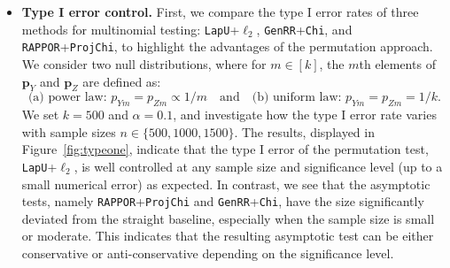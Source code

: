 \documentclass[twoside,11pt]{article}
\newcommand{\rvTwo}{Y}
\newcommand{\rvThree}{Z}
\newcommand{\vectorize}[1]{\mathbf{#1}}
\newcommand{\alphabetSize}{k} %
\newcommand{\vectorIndex}{m}
\newcommand{\probVecElement}[2]{p_{{#1}{#2}}}
\newcommand{\privacyParameter}{\alpha} %
\begin{document}
\begin{itemize}
\item \textbf{Type I error control.}
First, we compare the type I error rates of three methods for multinomial testing: \texttt{LapU}+\texttt{$\ell_2$}, \texttt{GenRR}+\texttt{Chi}, and \texttt{RAPPOR}+\texttt{ProjChi}, to highlight the advantages of the permutation approach. We consider two null distributions, where for \( m \in [\alphabetSize] \), the \( m \)th elements of \( \vectorize{p}_Y \) and \( \vectorize{p}_Z \) are defined as:
\begin{equation}\label{nulldist}
	\text{(a) power law: }\probVecElement{\rvTwo}{\vectorIndex} = \probVecElement{\rvThree}{\vectorIndex} \propto 1/\vectorIndex \quad \text{and} \quad \text{(b) uniform law: }\probVecElement{\rvTwo}{\vectorIndex} = \probVecElement{\rvThree}{\vectorIndex}=1/\alphabetSize.
\end{equation}
We set \(\alphabetSize = 500\) and \(\privacyParameter = 0.1\), and investigate how the type I error rate varies with sample sizes $n \in \{500, 1000, 1500\}$. The results, displayed in Figure~\ref{fig:typeone}, indicate that the type I error of the permutation test, \texttt{LapU}+\texttt{$\ell_2$}, is well controlled at any sample size and significance level (up to a small numerical error) as expected. In contrast, we see that the asymptotic tests, namely \texttt{RAPPOR}+\texttt{ProjChi} and \texttt{GenRR}+\texttt{Chi}, have the size significantly deviated from the straight baseline, especially when the sample size is small or moderate. This indicates that the resulting asymptotic test can be either conservative or anti-conservative depending on the significance level.


\end{itemize}
\end{document}
